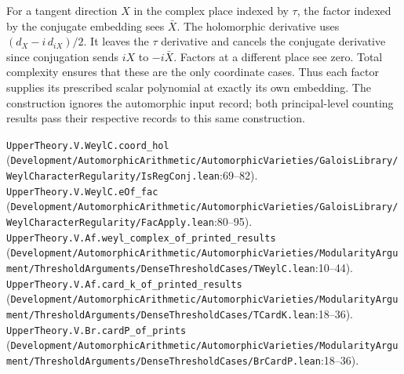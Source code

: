 For a tangent direction $X$ in the complex place indexed by $\tau$, the factor indexed by the conjugate embedding sees $\bar X$. The holomorphic derivative uses $(d_X-i\,d_{iX})/2$. It leaves the $\tau$ derivative and cancels the conjugate derivative since conjugation sends $iX$ to $-i\bar X$. Factors at a different place see zero. Total complexity ensures that these are the only coordinate cases. Thus each factor supplies its prescribed scalar polynomial at exactly its own embedding. The construction ignores the automorphic input record; both principal-level counting results pass their respective records to this same construction.
\par{\footnotesize \nolinkurl{UpperTheory.V.WeylC.coord_hol} (\nolinkurl{Development/AutomorphicArithmetic/AutomorphicVarieties/GaloisLibrary/WeylCharacterRegularity/IsRegConj.lean}\allowbreak:69--82). \nolinkurl{UpperTheory.V.WeylC.eOf_fac} (\nolinkurl{Development/AutomorphicArithmetic/AutomorphicVarieties/GaloisLibrary/WeylCharacterRegularity/FacApply.lean}\allowbreak:80--95). \nolinkurl{UpperTheory.V.Af.weyl_complex_of_printed_results} (\nolinkurl{Development/AutomorphicArithmetic/AutomorphicVarieties/ModularityArgument/ThresholdArguments/DenseThresholdCases/TWeylC.lean}\allowbreak:10--44). \nolinkurl{UpperTheory.V.Af.card_k_of_printed_results} (\nolinkurl{Development/AutomorphicArithmetic/AutomorphicVarieties/ModularityArgument/ThresholdArguments/DenseThresholdCases/TCardK.lean}\allowbreak:18--36). \nolinkurl{UpperTheory.V.Br.cardP_of_prints} (\nolinkurl{Development/AutomorphicArithmetic/AutomorphicVarieties/ModularityArgument/ThresholdArguments/DenseThresholdCases/BrCardP.lean}\allowbreak:18--36).\par}

